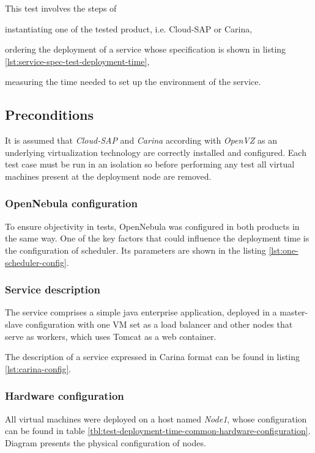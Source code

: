 This test involves the steps of
  \begin{inparaenum}[i)]
    \item instantiating one of the tested product, i.e. Cloud-SAP or Carina,
    \item ordering the deployment of a service whose specification is shown in listing \ref{lst:service-spec-test-deployment-time},
    \item measuring the time needed to set up the environment of the service.
  \end{inparaenum}

\subsection*{Preconditions}
It is assumed that \emph{Cloud-SAP} and \emph{Carina} according with \emph{OpenVZ} as an underlying virtualization technology are correctly installed and configured.
Each test case must be run in an isolation so before performing any test all virtual machines present at the deployment node are removed.
\subsubsection{OpenNebula configuration}
To ensure objectivity in tests, OpenNebula was configured in both products in the same way. One of the key factors that could influence the deployment time is the configuration of scheduler. Its parameters are shown in the listing \ref{lst:one-scheduler-config}.

\subsubsection{Service description}
The service comprises a simple java enterprise application, deployed in a master-slave configuration with one VM set as a load balancer and other nodes that serve as workers, which uses Tomcat as a web container.

The description of a service expressed in Carina format can be found in listing \ref{lst:carina-config}.

\subsubsection{Hardware configuration}

All virtual machines were deployed on a host named \emph{Node1}, whose configuration can be found in table \ref{tbl:test-deployment-time-common-hardware-configuration}. Diagram presents the physical configuration of nodes.

